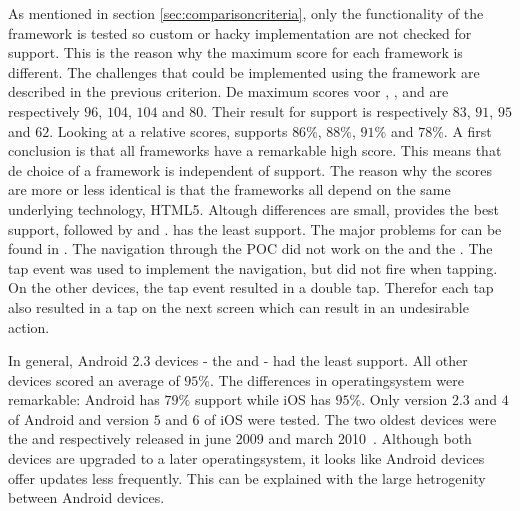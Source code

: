 \documentclass[a4paper]{artikel3}
\begin{document}
As mentioned in section \ref{sec:comparisoncriteria},  only the functionality of the framework is tested so custom or hacky implementation are not checked for support.
This is the reason why the maximum score for each framework is different.
The challenges that could be implemented using the framework are described in the previous criterion.
De maximum scores voor \sta{},  \kendob{},  \jqma{} and \lungo{} are respectively $96$, $104$, $104$ and $80$.
Their result for support is respectively $83$, $91$, $95$ and $62$.
Looking at a relative scores,  \st{} supports $86\%$,  \kendo{} $88\%$,  \jqm{} $91\%$ and \lungo $78\%$.
A first conclusion is that all frameworks have a remarkable high score.
This means that de choice of a framework is independent of support.
The reason why the scores are more or less identical is that the frameworks all depend on the same underlying technology,  HTML5.
Altough differences are small,  \jqma{} provides the best support,  followed by \kendob{} and \sta{}.
\lungo{} has the least support.
The major problems for \lungo{} can be found in .
The navigation through the POC did not work on the \htc{} and the \gtab{}. 
The tap event was used to implement the navigation, but did not fire when tapping.
On the other devices, the tap event resulted in a double tap.
Therefor each tap also resulted in a tap on the next screen which can result in an undesirable action.

In general,  Android 2.3 devices - the \htc{} and \gtab{} - had the least support.
All other devices scored an average of $95\%$.
The differences in operatingsystem were remarkable:  Android has $79\%$ support while iOS has $95\%$.
Only version $2.3$ and $4$ of Android and version $5$ and $6$ of iOS were tested.
The two oldest devices were the \iphoneiii{} and \gs{} respectively released in june 2009 and march 2010~\cite{Staff2009,Gideon2010}.
Although both devices are upgraded to a later operatingsystem,  it looks like Android devices offer updates less frequently.%
This can be explained with the large hetrogenity between Android devices.
\end{document}
